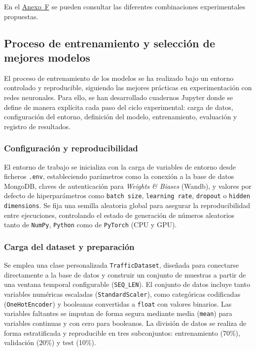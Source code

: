 En el \hyperref[anexo:combinaciones_exp]{Anexo~F} se pueden consultar las diferentes combinaciones experimentales propuestas.

\subsection{Proceso de entrenamiento y selección de mejores modelos}
\label{sec:entrenamiento_mej_modelos}

El proceso de entrenamiento de los modelos se ha realizado bajo un entorno controlado y reproducible, siguiendo las mejores prácticas en experimentación con redes neuronales. Para ello, se han desarrollado cuadernos Jupyter donde se define de manera explícita cada paso del ciclo experimental: carga de datos, configuración del entorno, definición del modelo, entrenamiento, evaluación y registro de resultados.

\subsubsection*{Configuración y reproducibilidad}  
El entorno de trabajo se inicializa con la carga de variables de entorno desde ficheros \texttt{.env}, estableciendo parámetros como la conexión a la base de datos MongoDB, claves de autenticación para \textit{Weights \& Biases} (Wandb), y valores por defecto de hiperparámetros como \texttt{batch size}, \texttt{learning rate}, \texttt{dropout} o \texttt{hidden dimensions}. Se fija una semilla aleatoria global para asegurar la reproducibilidad entre ejecuciones, controlando el estado de generación de números aleatorios tanto de \texttt{NumPy}, \texttt{Python} como de \texttt{PyTorch} (CPU y GPU).

\subsubsection*{Carga del dataset y preparación}  
Se emplea una clase personalizada \texttt{TrafficDataset}, diseñada para conectarse directamente a la base de datos y construir un conjunto de muestras a partir de una ventana temporal configurable (\texttt{SEQ\_LEN}). El conjunto de datos incluye tanto variables numéricas escaladas (\texttt{StandardScaler}), como categóricas codificadas (\texttt{OneHotEncoder}) y booleanas convertidas a \texttt{float} con valores binarios. Las variables faltantes se imputan de forma segura mediante media (\texttt{mean}) para variables continuas y con cero para booleanos. La división de datos se realiza de forma estratificada y reproducible en tres subconjuntos: entrenamiento (70\%), validación (20\%) y test (10\%).

